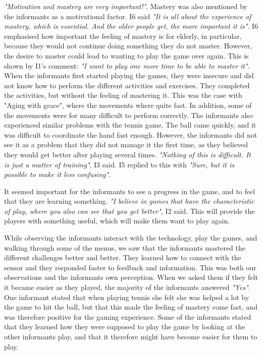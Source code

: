 \emph{"Motivation and mastery are very important!"}. Mastery was also mentioned by the informants as a motivational factor. I6 said \emph{"It is all about the experience of mastery, which is essential. And the older people get, the more important it is"}. I6 emphasised how important the feeling of mastery is for elderly, in particular, because they would not continue doing something they do not master. However, the desire to master could lead to wanting to play the game over again. This is shown by I1's comment: \emph{"I want to play one more time to be able to master it"}. When the informants first started playing the games, they were insecure and did not know how to perform the different activities and exercises. They completed the activities, but without the feeling of mastering it. This was the case with "Aging with grace", where the movements where quite fast. In addition, some of the movements were for many difficult to perform correctly. The informants also experienced similar problems with the tennis game. The ball came quickly, and it was difficult to coordinate the hand fast enough. However, the informants did not see it as a problem that they did not manage it the first time, as they believed they would get better after playing several times. \emph{"Nothing of this is difficult. It is just a matter of training"}, I3 said. I5 replied to this with \emph{"Sure, but it is possible to make it less confusing"}.  

It seemed important for the informants to see a progress in the game, and to feel that they are learning something. \emph{"I believe in games that have the characteristic of play, where you also can see that you get better"}, I2 said. This will provide the players with something useful, which will make them want to play again.

While observing the informants interact with the technology, play the games, and walking through some of the menus, we saw that the informants mastered the different challenges better and better. They learned how to connect with the sensor and they responded faster to feedback and information. This was both our observations and the informants own perception. When we asked them if they felt it became easier as they played, the majority of the informants answered \emph{"Yes"}. One informant stated that when playing tennis she felt she was helped a lot by the game to hit the ball, but that this made the feeling of mastery come fast, and was therefore positive for the gaming experience. Some of the informants stated that they learned how they were supposed to play the game by looking at the other informants play, and that it therefore might have become easier for them to play. 


